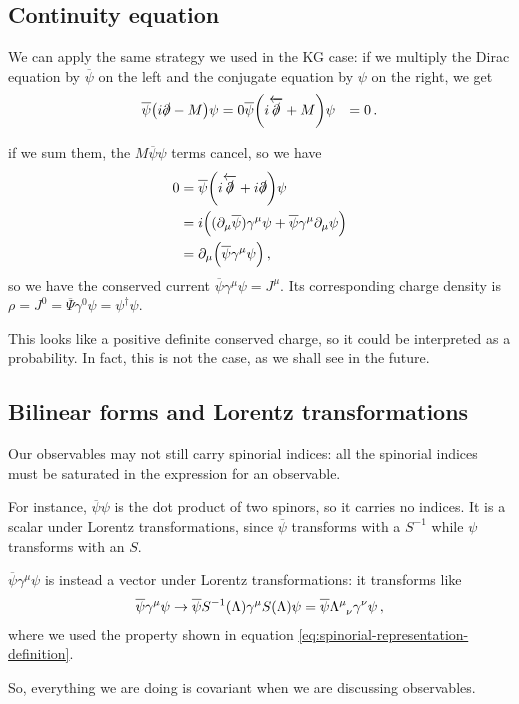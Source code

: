 \documentclass[main.tex]{subfiles}
\begin{document}
\subsection{Continuity equation}

We can apply the same strategy we used in the KG case: if we multiply the Dirac equation by \(\overline{\psi}\) on the left and the conjugate equation by \(\psi \) on the right, we get 
%
\begin{align}
\overline{\psi} \qty(i \slashed{\partial} - M ) \psi &= 0 
\overline{\psi} \qty(i \overleftarrow{\slashed{\partial}} + M ) \psi &= 0 
\,.
\end{align}

if we sum them, the \(M \overline{\psi} \psi  \) terms cancel, so we have 
%
\begin{align}
0 &= \overline{\psi} \qty(i \overleftarrow{\slashed{\partial}} + i \slashed{\partial}) \psi   \\
&= i \qty( (\partial_{\mu }\overline{\psi}) \gamma^{\mu } \psi   + \overline{\psi} \gamma^{\mu }\partial_{\mu } \psi)  \\
&= \partial_{\mu } \qty(\overline{\psi} \gamma^{\mu } \psi )
\,,
\end{align}
%
so we have the conserved current \(\overline{\psi} \gamma^{ \mu } \psi   = J^{\mu }\).
Its corresponding charge density is \(\rho = J^{0}= \overline{\Psi} \gamma^{0} \psi = \psi ^\dag \psi \). 

This looks like a positive definite conserved charge, so it could be interpreted as a probability. 
In fact, this is not the case, as we shall see in the future. 

\subsection{Bilinear forms and Lorentz transformations}

Our observables may not still carry spinorial indices: all the spinorial indices must be saturated in the expression for an observable.

For instance, \(\overline{\psi} \psi \) is the dot product of two spinors, so it carries no indices.
It is a scalar under Lorentz transformations, since \(\overline{\psi}\) transforms with a \(S^{-1}\) while \(\psi \) transforms with an \(S\).  

\(\overline{\psi} \gamma^{\mu } \psi \) is instead a vector under Lorentz transformations: it transforms like 
%
\begin{align}
\overline{\psi} \gamma^{\mu } \psi \rightarrow
\overline{\psi} S^{-1}(\Lambda ) \gamma^{\mu } S(\Lambda  ) \psi 
= \overline{\psi} \tensor{\Lambda }{^{\mu }_{\nu }} \gamma^{\nu } \psi 
\,,
\end{align}
%
where we used the property shown in equation \eqref{eq:spinorial-representation-definition}.

So, everything we are doing is covariant when we are discussing observables. 
\end{document}
